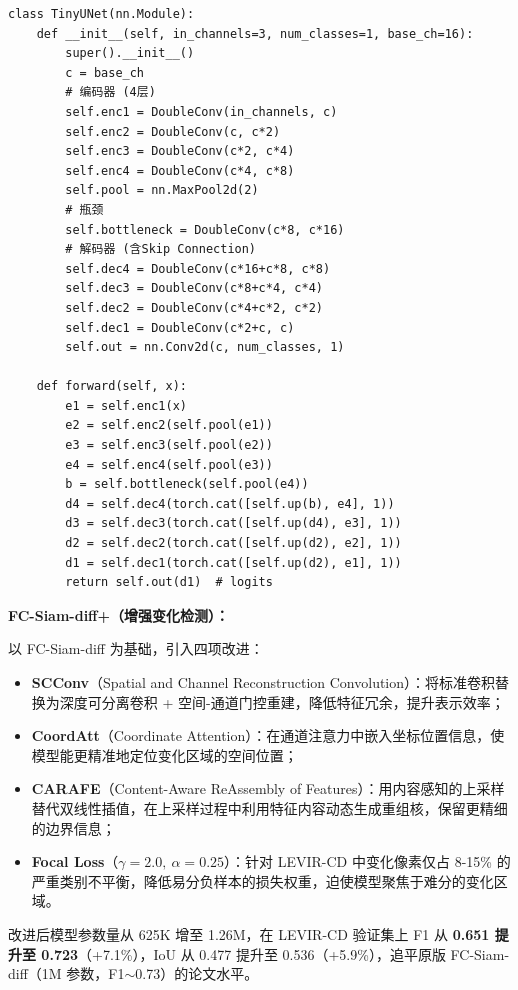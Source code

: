 \documentclass[12pt,a4paper]{article}
\begin{document}
\begin{lstlisting}
class TinyUNet(nn.Module):
    def __init__(self, in_channels=3, num_classes=1, base_ch=16):
        super().__init__()
        c = base_ch
        # 编码器 (4层)
        self.enc1 = DoubleConv(in_channels, c)
        self.enc2 = DoubleConv(c, c*2)
        self.enc3 = DoubleConv(c*2, c*4)
        self.enc4 = DoubleConv(c*4, c*8)
        self.pool = nn.MaxPool2d(2)
        # 瓶颈
        self.bottleneck = DoubleConv(c*8, c*16)
        # 解码器 (含Skip Connection)
        self.dec4 = DoubleConv(c*16+c*8, c*8)
        self.dec3 = DoubleConv(c*8+c*4, c*4)
        self.dec2 = DoubleConv(c*4+c*2, c*2)
        self.dec1 = DoubleConv(c*2+c, c)
        self.out = nn.Conv2d(c, num_classes, 1)

    def forward(self, x):
        e1 = self.enc1(x)
        e2 = self.enc2(self.pool(e1))
        e3 = self.enc3(self.pool(e2))
        e4 = self.enc4(self.pool(e3))
        b = self.bottleneck(self.pool(e4))
        d4 = self.dec4(torch.cat([self.up(b), e4], 1))
        d3 = self.dec3(torch.cat([self.up(d4), e3], 1))
        d2 = self.dec2(torch.cat([self.up(d2), e2], 1))
        d1 = self.dec1(torch.cat([self.up(d2), e1], 1))
        return self.out(d1)  # logits
\end{lstlisting}

\textbf{FC-Siam-diff+（增强变化检测）：}

以 FC-Siam-diff 为基础，引入四项改进：

\begin{itemize}
    \item \textbf{SCConv}（Spatial and Channel Reconstruction Convolution）：将标准卷积替换为深度可分离卷积 + 空间-通道门控重建，降低特征冗余，提升表示效率；
    \item \textbf{CoordAtt}（Coordinate Attention）：在通道注意力中嵌入坐标位置信息，使模型能更精准地定位变化区域的空间位置；
    \item \textbf{CARAFE}（Content-Aware ReAssembly of Features）：用内容感知的上采样替代双线性插值，在上采样过程中利用特征内容动态生成重组核，保留更精细的边界信息；
    \item \textbf{Focal Loss}（$\gamma=2.0,\ \alpha=0.25$）：针对 LEVIR-CD 中变化像素仅占 8-15\% 的严重类别不平衡，降低易分负样本的损失权重，迫使模型聚焦于难分的变化区域。
\end{itemize}

改进后模型参数量从 625K 增至 1.26M，在 LEVIR-CD 验证集上 F1 从 \textbf{0.651 提升至 0.723}（+7.1\%），IoU 从 0.477 提升至 0.536（+5.9\%），追平原版 FC-Siam-diff（1M 参数，F1$\sim$0.73）的论文水平。
\end{document}
